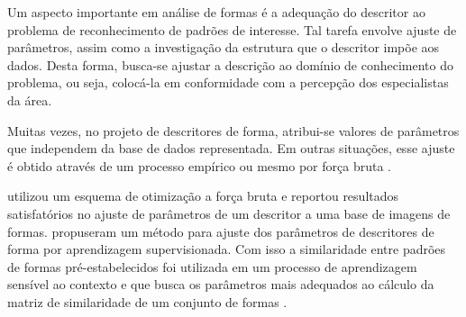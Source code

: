 



Um aspecto importante em análise de formas é a adequação do descritor ao problema de reconhecimento de padrões de interesse. Tal tarefa envolve ajuste de parâmetros, assim como a investigação da estrutura que o descritor impõe aos dados. Desta forma, busca-se ajustar a descrição ao domínio de conhecimento do problema, ou seja, colocá-la em conformidade com a percepção dos especialistas da área. 

Muitas vezes, no projeto de descritores de forma, atribui-se valores de parâmetros que independem da base de dados representada. Em outras situações, esse ajuste é obtido através de um processo empírico ou mesmo por força bruta \cite{mokhtarian1998robust, Ling:2007:SCU:1191552.1191806, Wang2012134}.

  utilizou um esquema de otimização a força bruta e reportou resultados satisfatórios no ajuste de parâmetros de um descritor a uma base de imagens de formas.   propuseram um método para ajuste dos parâmetros de descritores de forma por aprendizagem supervisionada. Com isso a similaridade entre padrões de formas pré-estabelecidos foi utilizada em um processo de aprendizagem sensível ao contexto e que busca os parâmetros mais adequados ao cálculo da matriz de similaridade de um conjunto de formas \cite{4815272}.

